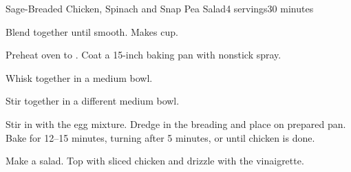 \documentclass[../Cookbook.tex]{subfiles}
\begin{document}
\begin{recipe}{Sage-Breaded Chicken, Spinach and Snap Pea Salad}{4 servings}{30 minutes}

Blend together until smooth. Makes  cup.

Preheat oven to . Coat a 15-inch baking pan with nonstick spray.

Whisk together in a medium bowl.

Stir together in a different medium bowl.

Stir in with the egg mixture. Dredge in the breading and place on prepared pan. Bake for 12--15 minutes, turning after 5 minutes, or until chicken is done.

Make a salad. Top with sliced chicken and drizzle with the vinaigrette.

\end{recipe}
\end{document}
